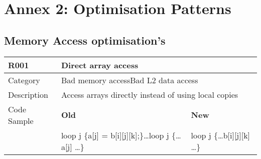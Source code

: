 \chapter{Annex 2: Optimisation Patterns}
\label{ch:ch07_optimization_patterns}

\section{Memory Access optimisation's}
\label{sec:Memory_Access_Optimizations}

\begin{tabular}{|p{0.9in}|p{2.0in}|p{2.0in}|} \hline
\textbf{R001}       & \multicolumn{2}{|p{4.0in}|}{\textbf{Direct array access}} \\ \hline
Category            & \multicolumn{2}{|p{4.0in}|}{Bad memory access\newline Bad L2 data access} \\ \hline
Description         & \multicolumn{2}{|p{4.0in}|}{Access arrays directly instead of using local copies} \\ \hline
Code Sample         & \textbf{Old}      & \textbf{New} \\ \hline
                    & loop j \{\newline   a[j] = b[i][j][k];\newline \}\newline \ldots\newline loop j \{\newline   \ldots a[j] \ldots\newline \}\newline
                    & loop j \{\newline   \ldots b[i][j][k] \ldots\newline \} \\ \hline
\end{tabular}

